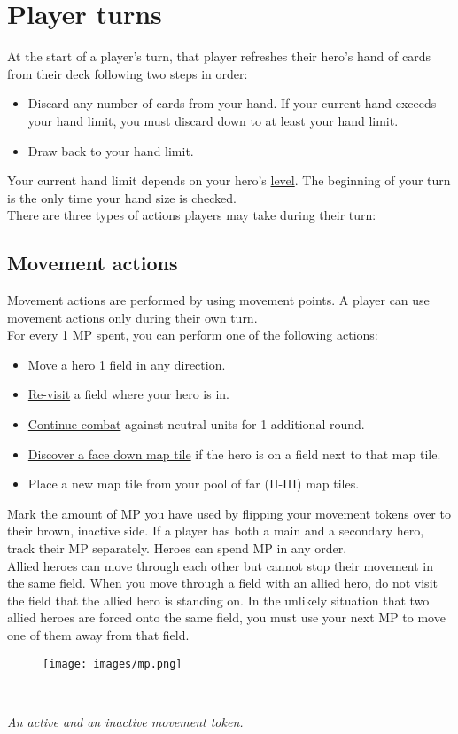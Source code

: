 \documentclass[12pt]{article}
\begin{document}
\clearpage

\section{Player turns}
At the start of a player’s turn, that player refreshes their hero's hand of cards from their deck following two steps in order:
\begin{itemize}
    \item Discard any number of cards from your hand. If your current hand exceeds your hand limit, you must discard down to at least your hand limit.
    \item Draw back to your hand limit.
\end{itemize}
Your current hand limit depends on your hero’s \hyperlink{Level}{level}. The beginning of your turn is the only time your hand size is checked.\\[6pt]
There are three types of actions players may take during their turn:
\subsection*{Movement actions}
Movement actions are performed by using movement points. A player can use movement actions only during their own turn.\\[6pt]
For every 1 MP spent, you can perform one of the following actions:
\begin{itemize}
    \item Move a hero 1 field in any direction.
    \item \hyperlink{Categories}{Re-visit} a field where your hero is in.
    \item \hyperlink{Timelimit}{Continue combat} against neutral units for 1 additional round.
    \item \hyperlink{Placing}{Discover a face down map tile} if the hero is on a field next to that map tile.
    \item Place a new map tile from your pool of far (II-III) map tiles.
\end{itemize}
Mark the amount of MP you have used by flipping your movement tokens over to their brown, inactive side. If a player has both a main and a secondary hero, track their MP separately. Heroes can spend MP in any order.\\[6pt]
Allied heroes can move through each other but cannot stop their movement in the same field. When you move through a field with an allied hero, do not visit the field that the allied hero is standing on. In the unlikely situation that two allied heroes are forced onto the same field, you must use your next MP to move one of them away from that field.\\[6pt]
\begin{figure}[h]
\centering
\texttt{[image: images/mp.png]}
\end{figure}\\
\begin{center}
\textit{An active and an inactive movement token.}
\end{center}
\end{document}
